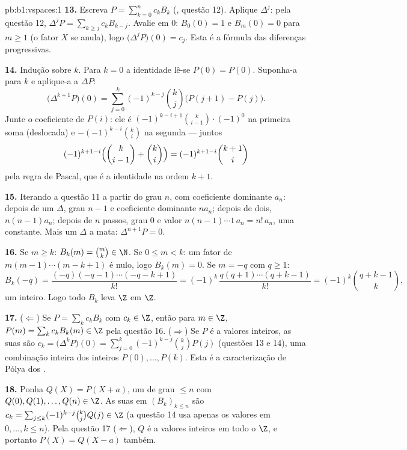 \begin{solution}{pb:b1:vspaces:1}
\textbf{13.} Escreva $P = \sum_{k=0}^{n} c_k B_k$ (, questão 12). Aplique $\Delta^{j}$: pela
questão 12, $\Delta^{j} P = \sum_{k
\geq j} c_k B_{k-j}$. Avalie em $0$: $B_0(0) = 1$ e $B_m(0) =
0$ para $m \geq 1$ (o fator
$X$ se anula), logo $\bigl(\Delta^{j}P\bigr)(0) = c_j$. Esta é a fórmula das diferenças
progressivas.

\textbf{14.} Indução sobre $k$. Para $k = 0$ a identidade lê-se
$P(0) = P(0)$. Suponha-a para $k$ e aplique-a a $\Delta P$:
\[
\bigl(\Delta^{k+1} P\bigr)(0)
= \sum_{j=0}^{k} (-1)^{k-j}\binom kj \bigl(P(j+1) - P(j)\bigr).
\]
Junte o coeficiente de $P(i)$: ele é $(-1)^{k-i+1}\binom
k{i-1}\cdot(-1)^{0}$ na primeira soma
(deslocada) e $-(-1)^{k-i}\binom ki$ na segunda --- juntos
\[
(-1)^{k+1-i}\Bigl(\binom k{i-1} + \binom ki\Bigr)
= (-1)^{k+1-i}\binom{k+1}i
\]
pela regra de Pascal, que é a identidade na ordem $k + 1$.

\textbf{15.} Iterando a questão 11 a partir do grau $n$, com
coeficiente dominante $a_n$: depois de um $\Delta$, grau $n-1$ e
coeficiente dominante $n a_n$; depois de dois, $n(n-1)a_n$; depois de $n$
passos, grau $0$ e valor $n(n-1)\cdots 1\, a_n = n!\,a_n$, uma constante.
Mais um $\Delta$ a mata: $\Delta^{n+1}P = 0$.

\textbf{16.} Se $m \geq k$: $B_k(m) = \binom mk \in \N$. Se $0
\leq m < k$: um fator de $m(m-1)\cdots(m-k+1)$ é nulo,
logo $B_k(m) = 0$. Se $m = -q$ com $q \geq 1$:
\[
B_k(-q) = \frac{(-q)(-q-1)\cdots(-q-k+1)}{k!}
= (-1)^k\,\frac{q(q+1)\cdots(q+k-1)}{k!}
= (-1)^k \binom{q+k-1}{k},
\]
um inteiro. Logo todo $B_k$ leva $\Z$ em $\Z$.

\textbf{17.} ($\Leftarrow$) Se $P = \sum_k c_k B_k$ com $c_k \in
\Z$, então para $m \in \Z$, $P(m) = \sum_k c_k B_k(m) \in \Z$
pela questão 16. ($\Rightarrow$) Se $P$ é a valores inteiros, as suas
 são $c_k = \bigl(\Delta^k P\bigr)(0) = \sum_{j=0}^k
(-1)^{k-j}\binom kj P(j)$ (questões 13 e 14), uma combinação inteira
dos inteiros $P(0), \dots, P(k)$. Esta é a caracterização de Pólya dos
.

\textbf{18.} Ponha $Q(X) = P(X + a)$, um  de grau $\leq n$ com $Q(0), Q(1), \dots, Q(n) \in \Z$.
As suas  em $(B_k)_{k \leq n}$ são $c_k = \sum_{j \leq k}(-1)^{k-j}\binom kj
Q(j) \in \Z$ (a questão 14 usa apenas os
valores em $0, \dots, k
\leq n$). Pela questão 17 ($\Leftarrow$), $Q$ é a valores
inteiros em todo o $\Z$, e portanto $P(X) = Q(X - a)$ também.


\end{solution}
